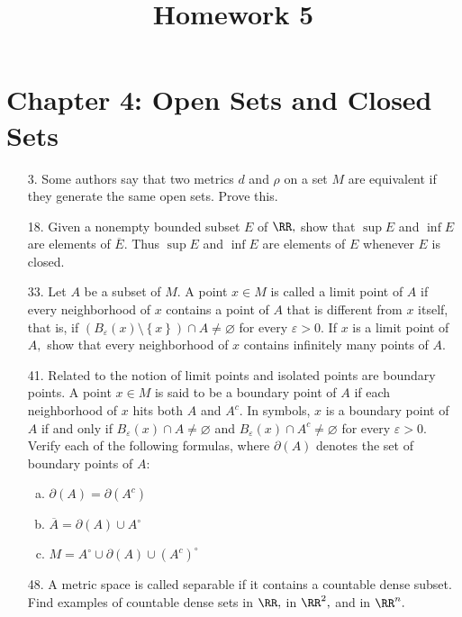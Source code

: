 \documentclass{article}
\begin{document}
\title{Homework 5}
\maketitle
\thispagestyle{fancy}

\section*{Chapter 4: Open Sets and Closed Sets}

\begin{itemize}
	\item[3.] Some authors say that two metrics $d$ and $\rho$ on a set $M$ are equivalent if they generate the same open sets. Prove this.

	\item[18.] Given a nonempty bounded subset $E$ of $\RR,$ show that $\sup E$ and $\inf E$ are elements of $\overline{E}.$ Thus $\sup E$ and $\inf E$ are elements of $E$ whenever $E$ is closed.

	\item[33.] Let $A$ be a subset of $M.$ A point $x\in M$ is called a limit point of $A$ if every neighborhood of $x$ contains a point of $A$ that is different from $x$ itself, that is, if $(B_\varepsilon(x)\setminus\left\{ x \right\})\cap A\neq\varnothing$ for every $\varepsilon>0.$ If $x$ is a limit point of $A,$ show that every neighborhood of $x$ contains infinitely many points of $A.$

	\item[41.] Related to the notion of limit points and isolated points are boundary points. A point $x\in M$ is said to be a boundary point of $A$ if each neighborhood of $x$ hits both $A$ and $A^c.$ In symbols, $x$ is a boundary point of $A$ if and only if $B_\varepsilon(x)\cap A\neq\varnothing$ and $B_\varepsilon(x)\cap A^c\neq\varnothing$ for every $\varepsilon>0.$ Verify each of the following formulas, where $\partial(A)$ denotes the set of boundary points of $A:$
		\begin{enumerate}[(a)]
			\item $\partial(A)=\partial(A^c)$

			\item $\overline{A}=\partial(A)\cup A^\circ$

			\item $M=A^\circ\cup \partial(A)\cup (A^c)^\circ$
				
		\end{enumerate}

	\item[48.] A metric space is called separable if it contains a countable dense subset. Find examples of countable dense sets in $\RR,$ in $\RR^2,$ and in $\RR^n.$
		
\end{itemize}
\end{document}
